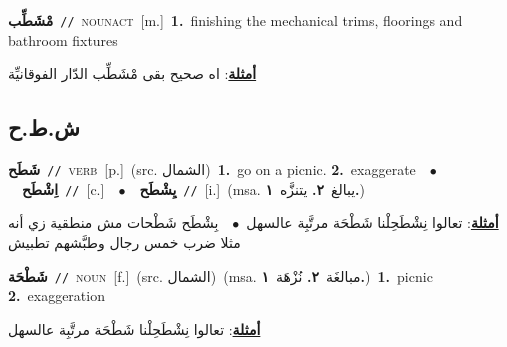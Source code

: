 \documentclass[10pt,a4paper,twoside]{article} %
\begin{document}
\begin{multicols}{2}
{\setlength\topsep{0pt}\textbf{\foreignlanguage{arabic}{مْشَطِّب}}\ {\color{gray}\texttt{//}\color{black}}\ \textsc{noun\textunderscore act}\ [m.]\ \textbf{1.}~finishing the mechanical trims, floorings and bathroom fixtures\  \begin{flushright}\color{gray}\foreignlanguage{arabic}{\textbf{\underline{\foreignlanguage{arabic}{أمثلة}}}: اه صحيح بقى مْشَطِّب الدّار الفوقانيِّة}\end{flushright}\color{black}} \vspace{2mm}

\vspace{-3mm}
\subsection*{\color{blue}\foreignlanguage{arabic}{ش.ط.ح}\color{blue}{}} 

{\setlength\topsep{0pt}\textbf{\foreignlanguage{arabic}{شَطَح}}\ {\color{gray}\texttt{//}\color{black}}\ \textsc{verb}\ [p.]\ (src. \color{gray}\foreignlanguage{arabic}{الشمال}\color{black})\ \textbf{1.}~go on a picnic.  \textbf{2.}~exaggerate\ \ $\bullet$\ \ \setlength\topsep{0pt}\textbf{\foreignlanguage{arabic}{اِشْطَح}}\ {\color{gray}\texttt{//}\color{black}}\ [c.]\ \ $\bullet$\ \ \setlength\topsep{0pt}\textbf{\foreignlanguage{arabic}{يِشْطَح}}\ {\color{gray}\texttt{//}\color{black}}\ [i.]\ \color{gray}(msa. \foreignlanguage{arabic}{يبالغ}~\foreignlanguage{arabic}{\textbf{٢.}}  \foreignlanguage{arabic}{يتنزَّه}~\foreignlanguage{arabic}{\textbf{١.}})\color{black}\  \begin{flushright}\color{gray}\foreignlanguage{arabic}{\textbf{\underline{\foreignlanguage{arabic}{أمثلة}}}: تعالوا نِشْطَحِلْنا شَطْحَة مرتَّبِة عالسهل\ $\bullet$\ \  بِشْطَح شَطْحات مش منطقية زي أنه مثلا ضرب خمس رجال وطبَّشهم تطبيش}\end{flushright}\color{black}} \vspace{2mm}

{\setlength\topsep{0pt}\textbf{\foreignlanguage{arabic}{شَطْحَة}}\ {\color{gray}\texttt{//}\color{black}}\ \textsc{noun}\ [f.]\ (src. \color{gray}\foreignlanguage{arabic}{الشمال}\color{black})\ \color{gray}(msa. \foreignlanguage{arabic}{مبالغَة}~\foreignlanguage{arabic}{\textbf{٢.}}  \foreignlanguage{arabic}{نُزْهَة}~\foreignlanguage{arabic}{\textbf{١.}})\color{black}\ \textbf{1.}~picnic  \textbf{2.}~exaggeration\  \begin{flushright}\color{gray}\foreignlanguage{arabic}{\textbf{\underline{\foreignlanguage{arabic}{أمثلة}}}: تعالوا نِشْطَحِلْنا شَطْحَة مرتَّبِة عالسهل}\end{flushright}\color{black}} \vspace{2mm}


\end{multicols}
\end{document}
